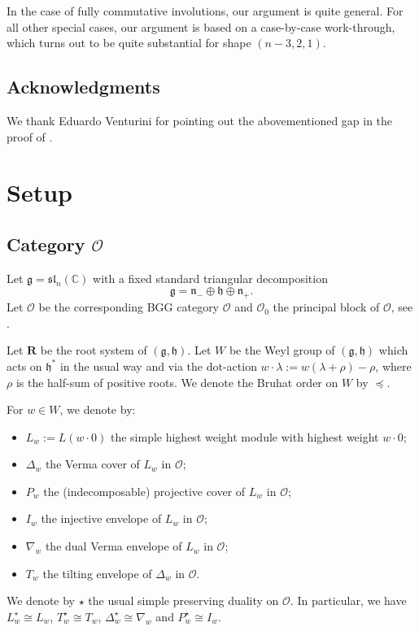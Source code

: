 \documentclass[a4paper]{amsart}
\def\HK#1{\textcolor[rgb]{.75,0.00,0.00}{[HK: #1]}}
\begin{document}
In the case of fully commutative involutions, our argument
is quite general. For all other special cases, our argument
is based on a case-by-case work-through, which turns out
to be quite  substantial for shape $(n-3,2,1)$.


\subsection*{Acknowledgments}

We thank Eduardo Venturini for pointing out the abovementioned gap in the 
proof of \cite[Proposition~8.15]{KMM}.

\section{Setup}\label{s2}

\subsection{Category $\mathcal{O}$}\label{s2.1}

Let $\mathfrak{g}=\mathfrak{sl}_n(\mathbb{C})$
with a fixed standard triangular decomposition
\begin{displaymath}
\mathfrak{g}=\mathfrak{n}_-\oplus \mathfrak{h}\oplus\mathfrak{n}_+. 
\end{displaymath}
Let $\mathcal{O}$ be the corresponding BGG category $\mathcal{O}$
and $\mathcal{O}_0$ the principal block of $\mathcal{O}$,
see \cite{BGG,Hu}.

Let $\mathbf{R}$ be the root system of $(\mathfrak{g},\mathfrak{h})$.
Let $W$ be the Weyl group of $(\mathfrak{g},\mathfrak{h})$
which acts on $\mathfrak{h}^*$ in the usual way and via the 
dot-action $w\cdot \lambda:=w(\lambda+\rho)-\rho$, where 
$\rho$ is the half-sum of positive roots.
We denote the Bruhat order on $W$ by $\preceq$.

For $w\in W$, we denote by:
\begin{itemize}
\item $L_w:=L(w\cdot 0)$ the simple highest weight module with 
highest weight $w\cdot 0$;
\item $\Delta_w$ the Verma cover of $L_w$ in $\mathcal{O}$;
\item $P_w$ the (indecomposable) projective cover of $L_w$ in $\mathcal{O}$;
\item $I_w$ the injective envelope of $L_w$ in $\mathcal{O}$;
\item $\nabla_w$ the dual Verma envelope of $L_w$ in $\mathcal{O}$;
\item $T_w$ the tilting envelope of $\Delta_w$ in $\mathcal{O}$.
\end{itemize}
We denote by $\star$ the usual simple preserving duality on
$\mathcal{O}$. In particular, we have $L_w^\star\cong L_w$,
$T_w^\star\cong T_w$, $\Delta_w^\star\cong \nabla_w$
and $P_w^\star\cong I_w$.
\end{document}

